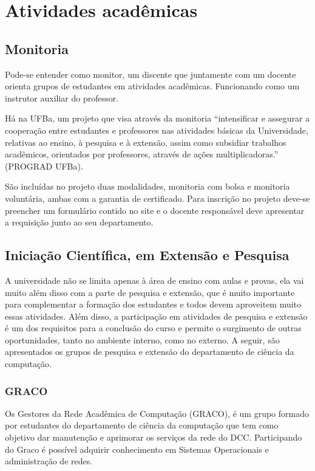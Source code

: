 \chapter{Atividades acadêmicas}
\DoPToC

\section{Monitoria}
    \par Pode-se entender como monitor, um discente que juntamente com um docente orienta grupos de estudantes em atividades acadêmicas. Funcionando como um instrutor auxiliar do professor.  \par Há na UFBa, um projeto que visa através da monitoria “intensificar e assegurar a cooperação entre estudantes e professores nas atividades básicas da Universidade, relativas ao ensino, à pesquisa e à extensão, assim como subsidiar trabalhos acadêmicos, orientados por professores, através de ações multiplicadoras.” (PROGRAD UFBa).  \par São incluídas no projeto duas modalidades, monitoria com bolsa e monitoria voluntária, ambas com a garantia de certificado. Para inscrição no projeto deve-se preencher um formulário contido no site e o docente responsável deve apresentar a requisição junto ao seu departamento.

\section{Iniciação Científica, em Extensão e Pesquisa} 
    \par A universidade não se limita apenas à área de ensino com aulas e provas, ela vai muito além disso com a parte de pesquisa e extensão, que é muito importante para complementar a formação dos estudantes e todos devem aproveitem muito essas atividades. Além disso, a participação em atividades de pesquisa e extensão é um dos requisitos para a conclusão do curso e permite o surgimento de outras oportunidades, tanto no ambiente interno, como no externo. A seguir, são apresentados os grupos de pesquisa e extensão do departamento de ciência da computação.
    
    \subsection{GRACO}
        \par Os Gestores da Rede Acadêmica de Computação (GRACO), é um grupo formado por estudantes do departamento de ciência da computação que tem como objetivo dar manutenção e aprimorar os serviços da rede do DCC. Participando do Graco é possível adquirir conhecimento em Sistemas Operacionais e administração de redes.
        
